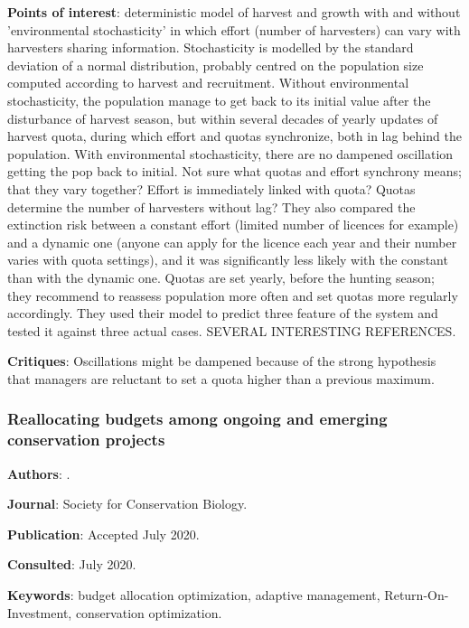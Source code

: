 \documentclass[12pt,a4paper]{article}
\begin{document}
\textbf{Points of interest}: deterministic model of harvest and growth with and without 'environmental stochasticity' in which effort (number of harvesters) can vary with harvesters sharing information. Stochasticity is modelled by the standard deviation of a normal distribution, probably centred on the population size computed according to harvest and recruitment. Without environmental stochasticity, the population manage to get back to its initial value after the disturbance of harvest season, but within several decades of yearly updates of harvest quota, during which effort and quotas synchronize, both in lag behind the population. With environmental stochasticity, there are no dampened oscillation getting the pop back to initial. Not sure what quotas and effort synchrony means; that they vary together? Effort is immediately linked with quota? Quotas determine the number of harvesters without lag? They also compared the extinction risk between a constant effort (limited number of licences for example) and a dynamic one (anyone can apply for the licence each year and their number varies with quota settings), and it was significantly less likely with the constant than with the dynamic one. Quotas are set yearly, before the hunting season; they recommend to reassess population more often and set quotas more regularly accordingly. They used their model to predict three feature of the system and tested it against three actual cases.
SEVERAL INTERESTING REFERENCES.

\textbf{Critiques}: Oscillations might be dampened because of the strong hypothesis that managers are reluctant to set a quota higher than a previous maximum.
 
\newpage

\subsubsection*{Reallocating budgets among ongoing and emerging conservation projects}

\textbf{Authors}: \cite{wu2020reallocating}.

\textbf{Journal}: Society for Conservation Biology.

\textbf{Publication}: Accepted July 2020.

\textbf{Consulted}: July 2020.

\textbf{Keywords}: budget allocation optimization, adaptive management, Return-On-Investment, conservation optimization.
\end{document}
